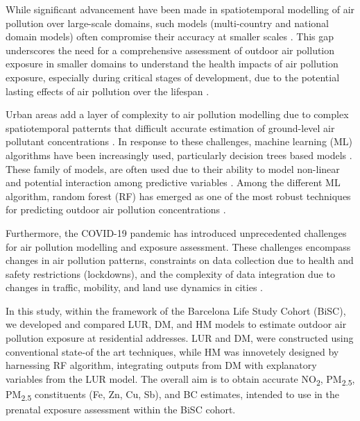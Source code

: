 \documentclass{article}
\begin{document}
While significant advancement have been made in spatiotemporal modelling of air pollution over large-scale domains, such models (multi-country and national domain models) often compromise their accuracy at smaller scales \cite{dehoogh2016, chen2019, chen2020, shen2022}. This gap underscores the need for a comprehensive assessment of outdoor air pollution exposure in smaller domains to understand the health impacts of air pollution exposure, especially during critical stages of development, due to the potential lasting effects of air pollution over the lifespan \cite{selevan2000, wick2010, ghosh2021}. 

Urban areas add a layer of complexity to air pollution modelling due to complex spatiotemporal patternts that difficult accurate estimation of ground-level air pollutant concentrations \cite{sokhi2022}. In response to these challenges, machine learning (ML) algorithms have been increasingly used, particularly decision trees based models \cite{liu2022}. These family of models, are often used due to their ability to model non-linear and potential interaction among predictive variables \cite{liu2022treebased}. Among the different ML algorithm, random forest (RF) has emerged as one of the most robust techniques for predicting outdoor air pollution concentrations \cite{chen2019, chen2020, stafoggia2019, stafoggia2020, schneider2020, mila2023}.

Furthermore, the COVID-19 pandemic has introduced unprecedented challenges for air pollution modelling and exposure assessment. These challenges encompass changes in air pollution patterns, constraints on data collection due to health and safety restrictions (lockdowns), and the complexity of data integration due to changes in traffic, mobility, and land use dynamics in cities \cite{gonzalez2022, querol2021}. 
 
In this study, within the framework of the Barcelona Life Study Cohort (BiSC), we developed and compared LUR, DM, and HM models to estimate outdoor air pollution exposure at residential addresses. LUR and DM, were constructed using conventional state-of the art techniques, while HM was innovetely designed by harnessing RF algorithm, integrating outputs from DM with explanatory variables from the LUR model. The overall aim is to obtain accurate NO\textsubscript{2}, PM\textsubscript{2.5}, PM\textsubscript{2.5} constituents (Fe, Zn, Cu, Sb), and BC estimates, intended to use in the prenatal exposure assessment within the BiSC cohort. 

\end{document}
